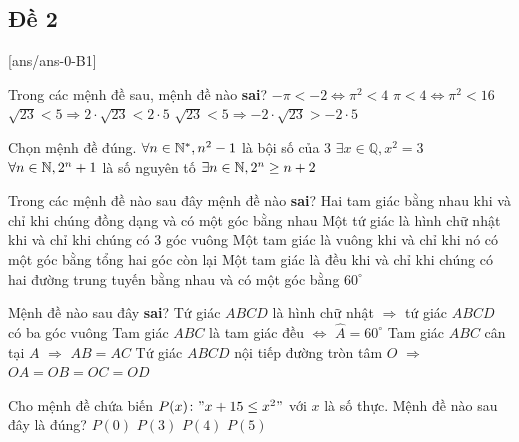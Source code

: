 \subsection{Đề 2}
[ans/ans-0-B1]
\caulc
\begin{ex}%
	Trong các mệnh đề sau, mệnh đề nào {\bf sai}?
	\choice
	{\True $-\pi <-2 \Leftrightarrow \pi^2 < 4$}
	{$\pi < 4 \Leftrightarrow \pi^2 < 16$}
	{$\sqrt{23} < 5 \Rightarrow 2\cdot \sqrt{23} < 2\cdot 5$}
	{$\sqrt{23} < 5 \Rightarrow-2\cdot \sqrt{23} >-2\cdot 5$}
\end{ex}
\begin{ex}%
	Chọn mệnh đề đúng.
	\choice
	{$\forall n\in {\bf \mathbb{N}}^{*}, n^2-1$ là bội số của $3$}
	{$\exists x\in \mathbb{Q}, x^2=3$}
	{$\forall n\in {\bf \mathbb{N}}, 2^n+1$ là số nguyên tố}
	{\True $\exists n\in {\bf \mathbb{N}}, 2^n \ge n+2$}
\end{ex}
\begin{ex}%
	Trong các mệnh đề nào sau đây mệnh đề nào {\bf sai}?
	\choice
	{\True Hai tam giác bằng nhau khi và chỉ khi chúng đồng dạng và có một góc bằng nhau}
	{Một tứ giác là hình chữ nhật khi và chỉ khi chúng có $3$ góc vuông}
	{Một tam giác là vuông khi và chỉ khi nó có một góc bằng tổng hai góc còn lại}
	{Một tam giác là đều khi và chỉ khi chúng có hai đường trung tuyến bằng nhau và có một góc bằng $60^{\circ}$}
\end{ex}
\begin{ex}%
	Mệnh đề nào sau đây {\bf sai}?
	\choice
	{Tứ giác $ABCD$ là hình chữ nhật $\Rightarrow$ tứ giác $ABCD$ có ba góc vuông}
	{\True Tam giác $ABC$ là tam giác đều $\Leftrightarrow$ $\widehat{A}=60^\circ$}
	{Tam giác $ABC$ cân tại $A$ $\Rightarrow$ $AB=AC$}
	{Tứ giác $ABCD$ nội tiếp đường tròn tâm $O$ $\Rightarrow$ $OA=OB=OC=OD$}
\end{ex}
\begin{ex}%
	Cho mệnh đề chứa biến $P(x)\colon"x+15\le x^2 "$ với $x$ là số thực. Mệnh đề nào sau đây là đúng?
	\choice
	{$P(0)$}
	{$P(3)$}
	{$P(4)$}
	{\True $P(5)$}
\end{ex}
